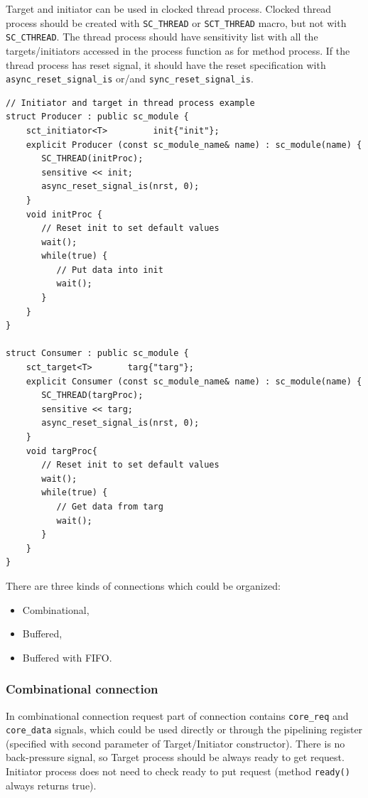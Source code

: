 Target and initiator can be used in clocked thread process. Clocked thread process should be created with {\tt SC\_THREAD} or {\tt SCT\_THREAD} macro, but not with {\tt SC\_CTHREAD}. The thread process should have sensitivity list with all the targets/initiators accessed in the process function as for method process. If the thread process has reset signal, it should have the reset specification with {\tt async\_reset\_signal\_is} or/and {\tt sync\_reset\_signal\_is}.

\begin{lstlisting}[style=mycpp]
// Initiator and target in thread process example
struct Producer : public sc_module {
    sct_initiator<T>         init{"init"};
    explicit Producer (const sc_module_name& name) : sc_module(name) {
       SC_THREAD(initProc); 
       sensitive << init;
       async_reset_signal_is(nrst, 0);
    } 
    void initProc {
       // Reset init to set default values
       wait();
       while(true) {
          // Put data into init 
          wait();
       }
    }
}

struct Consumer : public sc_module {
    sct_target<T>       targ{"targ"};   
    explicit Consumer (const sc_module_name& name) : sc_module(name) {
       SC_THREAD(targProc); 
       sensitive << targ;
       async_reset_signal_is(nrst, 0);
    } 
    void targProc{
       // Reset init to set default values
       wait();
       while(true) {
          // Get data from targ
          wait();
       }
    }
}
\end{lstlisting}

There are three kinds of connections which could be organized:
\begin{itemize}
\item Combinational,
\item Buffered,
\item Buffered with FIFO.
\end{itemize}

\subsubsection{Combinational connection}

In combinational connection request part of connection contains {\tt core\_req} and {\tt core\_data} signals, which could be used directly or through the pipelining register (specified with second parameter of Target/Initiator constructor). There is no back-pressure signal, so Target process should be always ready to get request. Initiator process does not need to check ready to put request (method {\tt ready()} always returns true).

